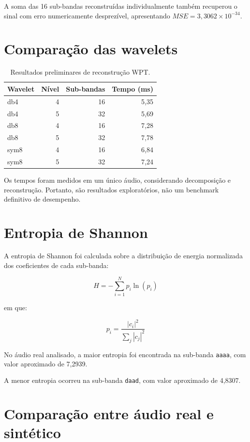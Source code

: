 \documentclass[12pt,a4paper]{article}
\begin{document}
A soma das 16 sub-bandas reconstruídas individualmente
também recuperou o sinal com erro numericamente
desprezível, apresentando
$MSE = 3{,}3062 \times 10^{-34}$.

\section{Comparação das wavelets}

\begin{table}[H]
\centering
\caption{Resultados preliminares de reconstrução WPT.}
\begin{tabular}{lrrr}
\toprule
Wavelet & Nível & Sub-bandas & Tempo (ms)\\
\midrule
db4 & 4 & 16 & 5,35\\
db4 & 5 & 32 & 5,69\\
db8 & 4 & 16 & 7,28\\
db8 & 5 & 32 & 7,78\\
sym8 & 4 & 16 & 6,84\\
sym8 & 5 & 32 & 7,24\\
\bottomrule
\end{tabular}
\end{table}

Os tempos foram medidos em um único áudio,
considerando decomposição e reconstrução.
Portanto, são resultados exploratórios,
não um benchmark definitivo de desempenho.

\section{Entropia de Shannon}

A entropia de Shannon foi calculada sobre a
distribuição de energia normalizada dos
coeficientes de cada sub-banda:

\begin{equation}
H = -\sum_{i=1}^{N} p_i \ln(p_i)
\end{equation}

em que:

\begin{equation}
p_i = \frac{|c_i|^2}{\sum_j |c_j|^2}
\end{equation}

No áudio real analisado, a maior entropia
foi encontrada na sub-banda \texttt{aaaa},
com valor aproximado de 7,2939.

A menor entropia ocorreu na sub-banda
\texttt{daad}, com valor aproximado de 4,8307.

\section{Comparação entre áudio real e sintético}
\end{document}
